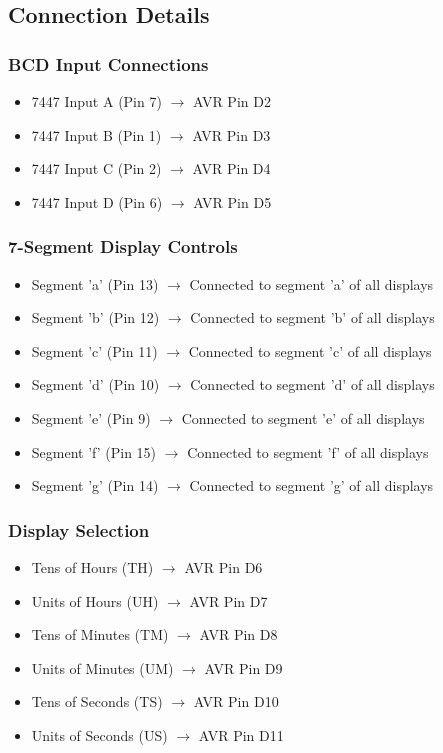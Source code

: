 \documentclass[12pt]{article}
\begin{document}
\subsection{Connection Details}
\subsubsection{BCD Input Connections}
\begin{itemize}
    \item 7447 Input A (Pin 7) $\rightarrow$ AVR Pin D2
    \item 7447 Input B (Pin 1) $\rightarrow$ AVR Pin D3
    \item 7447 Input C (Pin 2) $\rightarrow$ AVR Pin D4
    \item 7447 Input D (Pin 6) $\rightarrow$ AVR Pin D5
\end{itemize}
    
\subsubsection{7-Segment Display Controls}
\begin{itemize}
    \item Segment 'a' (Pin 13) $\rightarrow$ Connected to segment 'a' of all displays
    \item Segment 'b' (Pin 12) $\rightarrow$ Connected to segment 'b' of all displays
    \item Segment 'c' (Pin 11) $\rightarrow$ Connected to segment 'c' of all displays
    \item Segment 'd' (Pin 10) $\rightarrow$ Connected to segment 'd' of all displays
    \item Segment 'e' (Pin 9) $\rightarrow$ Connected to segment 'e' of all displays
    \item Segment 'f' (Pin 15) $\rightarrow$ Connected to segment 'f' of all displays
    \item Segment 'g' (Pin 14) $\rightarrow$ Connected to segment 'g' of all displays
\end{itemize}
    
\subsubsection{Display Selection}
\begin{itemize}
    \item Tens of Hours (TH) $\rightarrow$ AVR Pin D6
    \item Units of Hours (UH) $\rightarrow$ AVR Pin D7
    \item Tens of Minutes (TM) $\rightarrow$ AVR Pin D8
    \item Units of Minutes (UM) $\rightarrow$ AVR Pin D9
    \item Tens of Seconds (TS) $\rightarrow$ AVR Pin D10
    \item Units of Seconds (US) $\rightarrow$ AVR Pin D11
\end{itemize}
\end{document}
